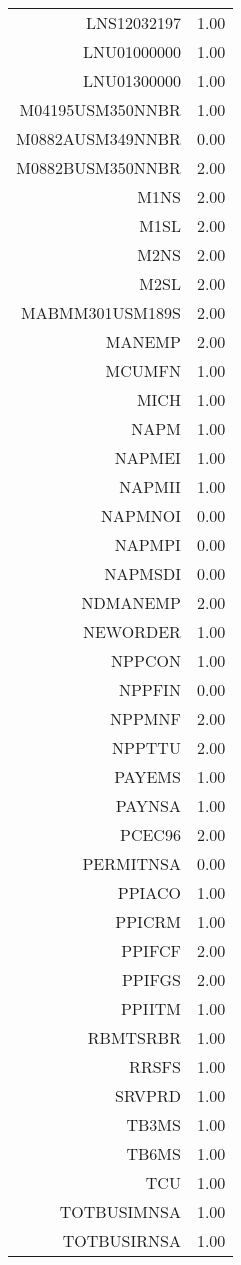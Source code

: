 \begin{table}[ht]
\begin{tabular}{rr}
  LNS12032197 & 1.00 \\ 
  LNU01000000 & 1.00 \\ 
  LNU01300000 & 1.00 \\ 
  M04195USM350NNBR & 1.00 \\ 
  M0882AUSM349NNBR & 0.00 \\ 
  M0882BUSM350NNBR & 2.00 \\ 
  M1NS & 2.00 \\ 
  M1SL & 2.00 \\ 
  M2NS & 2.00 \\ 
  M2SL & 2.00 \\ 
  MABMM301USM189S & 2.00 \\ 
  MANEMP & 2.00 \\ 
  MCUMFN & 1.00 \\ 
  MICH & 1.00 \\ 
  NAPM & 1.00 \\ 
  NAPMEI & 1.00 \\ 
  NAPMII & 1.00 \\ 
  NAPMNOI & 0.00 \\ 
  NAPMPI & 0.00 \\ 
  NAPMSDI & 0.00 \\ 
  NDMANEMP & 2.00 \\ 
  NEWORDER & 1.00 \\ 
  NPPCON & 1.00 \\ 
  NPPFIN & 0.00 \\ 
  NPPMNF & 2.00 \\ 
  NPPTTU & 2.00 \\ 
  PAYEMS & 1.00 \\ 
  PAYNSA & 1.00 \\ 
  PCEC96 & 2.00 \\ 
  PERMITNSA & 0.00 \\ 
  PPIACO & 1.00 \\ 
  PPICRM & 1.00 \\ 
  PPIFCF & 2.00 \\ 
  PPIFGS & 2.00 \\ 
  PPIITM & 1.00 \\ 
  RBMTSRBR & 1.00 \\ 
  RRSFS & 1.00 \\ 
  SRVPRD & 1.00 \\ 
  TB3MS & 1.00 \\ 
  TB6MS & 1.00 \\ 
  TCU & 1.00 \\ 
  TOTBUSIMNSA & 1.00 \\ 
  TOTBUSIRNSA & 1.00 \\ 

\end{tabular}
\end{table}
